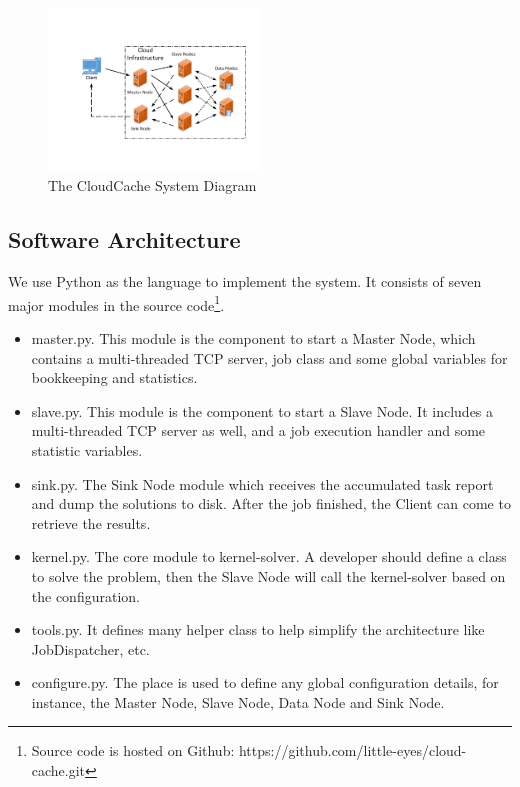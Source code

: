 \begin{figure}
\centering
\includegraphics[width=0.5\textwidth]{pics/cloud-cache-arch.pdf}
\caption{The CloudCache System Diagram}
\label{fig:system}
\end{figure}

\subsection{Software Architecture}
We use Python as the language to implement the system. It consists of seven major modules in the source code\footnote{Source code is hosted on Github: https://github.com/little-eyes/cloud-cache.git}.

\begin{itemize}
\item master.py. This module is the component to start a Master Node, which contains a multi-threaded TCP server, job class and some global variables for bookkeeping and statistics.

\item slave.py. This module is the component to start a Slave Node. It includes a multi-threaded TCP server as well, and a job execution handler and some statistic variables.
\item sink.py. The Sink Node module which receives the accumulated task report and dump the solutions to disk. After the job finished, the Client can come to retrieve the results.
\item kernel.py. The core module to kernel-solver. A developer should define a class to solve the problem, then the Slave Node will call the kernel-solver based on the configuration.
\item tools.py. It defines many helper class to help simplify the architecture like JobDispatcher, etc.
\item configure.py. The place is used to define any global configuration details, for instance, the Master Node, Slave Node, Data Node and Sink Node.
\end{itemize}

